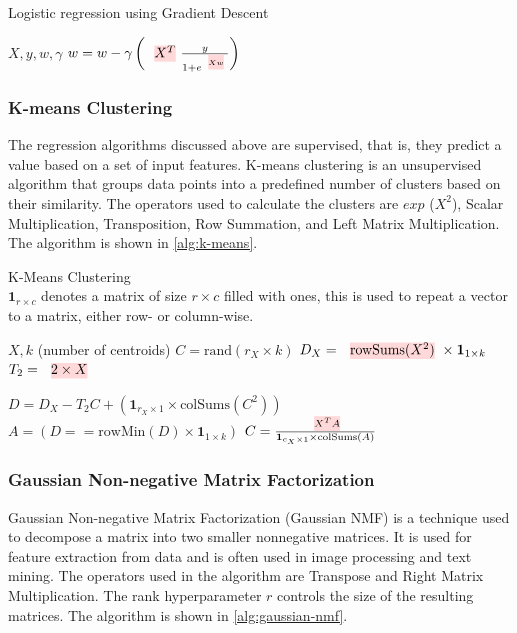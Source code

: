 \begin{algorithm}[ht]
  \caption[Linear regression]{Logistic regression using Gradient Descent
    \cite{morpheus}}\label{alg:logistic-regression}
  \begin{algorithmic}
    \Require $X, y , w, \gamma$
    \State $w = w - \gamma \left(\text{\red{$X^T$}} \frac{y}{1+e^{\text{\red{$X w$}}}}\right)$
    \EndFor
  \end{algorithmic}
\end{algorithm}

\subsubsection{K-means Clustering}
The regression algorithms discussed above are supervised, that is, they predict a value based on a set of input features. K-means clustering is an unsupervised algorithm that groups data points into a predefined number of clusters based on their similarity. The operators used to calculate the clusters are $exp$ ($X^2$), Scalar Multiplication, Transposition, Row Summation, and Left Matrix Multiplication. The algorithm is shown in \autoref{alg:k-means}.

\begin{algorithm}[ht]
  \caption[K-Means Clustering]{K-Means Clustering
    \cite{morpheus}\\
    $\mathbf{1}_{r \times c}$ denotes a matrix of size $r \times c$ filled with ones, this is used to repeat a vector to a matrix, either row- or column-wise.}\label{alg:k-means}
  \begin{algorithmic}
    \Require $X, k$ (number of centroids)
    \State $C = \text{rand}(r_X \times k)$ 
    \State $D_X = \text{\red{rowSums($X^2$)}} \times \mathbf{1}_{1 \times k}$ 
    \State $T_2 = \text{\red{$2 \times X$}}$

    \State $D = D_X - T_2C + \left( \mathbf{1}_{r_X\times 1} \times \text{colSums}(C^2) \right)$ 
    \State $A = (D == \text{rowMin}(D) \times \mathbf{1}_{1 \times k})$ 
    \State $C =\frac{\text{\red{$X^T A$}}}{\mathbf{1}_{c_X \times 1} \times \text{colSums}(A)}$ 
    \EndFor
  \end{algorithmic}
\end{algorithm}

\subsubsection{Gaussian Non-negative Matrix Factorization}
Gaussian Non-negative Matrix Factorization (Gaussian NMF) is a technique used to decompose a matrix into two smaller nonnegative matrices. It is used for feature extraction from data and is often used in image processing and text mining. The operators used in the algorithm are Transpose and Right Matrix Multiplication. The rank hyperparameter $r$ controls the size of the resulting matrices. The algorithm is shown in \autoref{alg:gaussian-nmf}.

